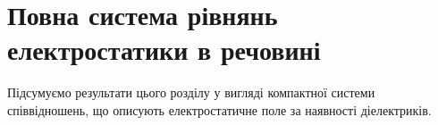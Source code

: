 \section{Повна система рівнянь електростатики в речовині}

Підсумуємо результати цього розділу у вигляді компактної системи співвідношень, що описують електростатичне поле за наявності діелектриків.

